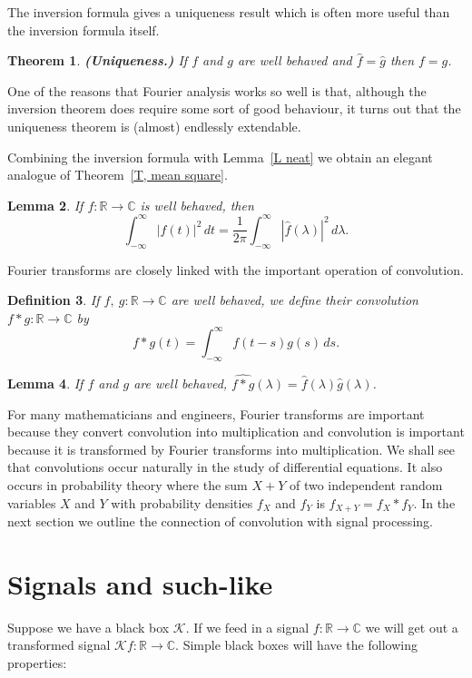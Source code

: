 \documentclass[12pt]{article}
\newtheorem{theorem}{Theorem}[section]
\newtheorem{lemma}[theorem]{Lemma}
\newtheorem{definition}[theorem]{Definition}
\theoremstyle{definition}
\begin{document}
The inversion formula gives a uniqueness result which
is often more useful than the inversion formula itself.
\begin{theorem}{\bf (Uniqueness.)} If $f$ and $g$
are well behaved and
$\hat{f}=\hat{g}$ then $f=g$.
\end{theorem}
One of the reasons that Fourier analysis works so well
is that, although the inversion theorem does require
some sort of good behaviour, it turns out that the
uniqueness theorem is (almost) endlessly extendable.

Combining the inversion formula with Lemma~\ref{L neat}
we obtain an elegant
analogue of Theorem~\ref{T, mean square}.
\begin{lemma} If $f:{\mathbb R}\rightarrow{\mathbb C}$
is well behaved, then
\[\int_{-\infty}^{\infty}|f(t)|^{2}\,dt
=\frac{1}{2\pi}\int_{-\infty}^{\infty}|\hat{f}(\lambda)|^{2}\,d\lambda.\]
\end{lemma}

Fourier transforms are closely linked with the
important operation of convolution.
\begin{definition} If $f,\ g:{\mathbb R}\rightarrow{\mathbb C}$
are well behaved, we define their \emph{convolution}
$f*g:{\mathbb R}\rightarrow{\mathbb C}$ by
\[f*g(t)=\int_{-\infty}^{\infty}f(t-s)g(s)\,ds.\]
\end{definition}
\begin{lemma} If $f$ and $g$ are well behaved, 
$\widehat{f*g}(\lambda)=\hat{f}(\lambda)\hat{g}(\lambda)$.
\end{lemma}
For many mathematicians and engineers, Fourier transforms are
important because they convert convolution into multiplication
and convolution is important because it is transformed
by Fourier transforms into multiplication.
We shall see that convolutions occur naturally in the
study of differential equations.
It also occurs in probability theory where the sum $X+Y$
of two independent random variables $X$ and $Y$ with
probability densities $f_{X}$ and $f_{Y}$ is
$f_{X+Y}=f_{X}*f_{Y}$. In the next section
we outline the connection of convolution with signal
processing.
\section{Signals and such-like}\label{Green} Suppose we have a black box
${\mathcal K}$. If we feed in a signal 
$f:{\mathbb R}\rightarrow{\mathbb C}$ we will get out
a transformed signal 
${\mathcal K}f:{\mathbb R}\rightarrow{\mathbb C}$.
Simple black boxes will have the following properties:
\end{document}
